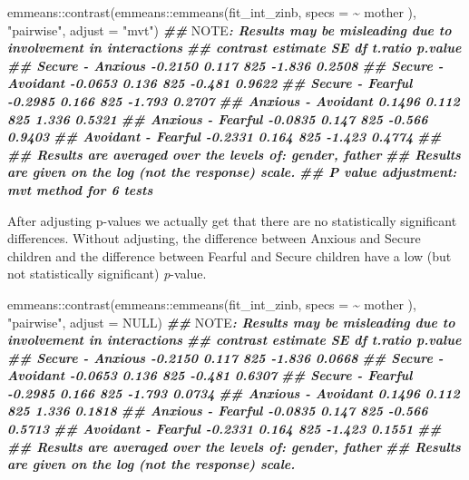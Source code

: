 \documentclass[
]{book}
\newenvironment{Shaded}{\begin{snugshade}}{\end{snugshade}}
\newcommand{\AlertTok}[1]{\textcolor[rgb]{0.94,0.16,0.16}{#1}}
\newcommand{\AttributeTok}[1]{\textcolor[rgb]{0.77,0.63,0.00}{#1}}
\newcommand{\ConstantTok}[1]{\textcolor[rgb]{0.00,0.00,0.00}{#1}}
\newcommand{\DocumentationTok}[1]{\textcolor[rgb]{0.56,0.35,0.01}{\textbf{\textit{#1}}}}
\newcommand{\FunctionTok}[1]{\textcolor[rgb]{0.00,0.00,0.00}{#1}}
\newcommand{\NormalTok}[1]{#1}
\newcommand{\SpecialCharTok}[1]{\textcolor[rgb]{0.00,0.00,0.00}{#1}}
\newcommand{\StringTok}[1]{\textcolor[rgb]{0.31,0.60,0.02}{#1}}
\begin{document}
\begin{Shaded}
\begin{Highlighting}[]
\NormalTok{emmeans}\SpecialCharTok{::}\FunctionTok{contrast}\NormalTok{(emmeans}\SpecialCharTok{::}\FunctionTok{emmeans}\NormalTok{(fit\_int\_zinb, }\AttributeTok{specs =} \SpecialCharTok{\textasciitilde{}}\NormalTok{ mother ),}
                  \StringTok{"pairwise"}\NormalTok{, }\AttributeTok{adjust =} \StringTok{"mvt"}\NormalTok{)}
\DocumentationTok{\#\# }\AlertTok{NOTE}\DocumentationTok{: Results may be misleading due to involvement in interactions}
\DocumentationTok{\#\#  contrast           estimate    SE  df t.ratio p.value}
\DocumentationTok{\#\#  Secure {-} Anxious    {-}0.2150 0.117 825  {-}1.836  0.2508}
\DocumentationTok{\#\#  Secure {-} Avoidant   {-}0.0653 0.136 825  {-}0.481  0.9622}
\DocumentationTok{\#\#  Secure {-} Fearful    {-}0.2985 0.166 825  {-}1.793  0.2707}
\DocumentationTok{\#\#  Anxious {-} Avoidant   0.1496 0.112 825   1.336  0.5321}
\DocumentationTok{\#\#  Anxious {-} Fearful   {-}0.0835 0.147 825  {-}0.566  0.9403}
\DocumentationTok{\#\#  Avoidant {-} Fearful  {-}0.2331 0.164 825  {-}1.423  0.4774}
\DocumentationTok{\#\# }
\DocumentationTok{\#\# Results are averaged over the levels of: gender, father }
\DocumentationTok{\#\# Results are given on the log (not the response) scale. }
\DocumentationTok{\#\# P value adjustment: mvt method for 6 tests}
\end{Highlighting}
\end{Shaded}

After adjusting p-values we actually get that there are no statistically significant differences. Without adjusting, the difference between Anxious and Secure children and the difference between Fearful and Secure children have a low (but not statistically significant) \emph{p}-value.

\begin{Shaded}
\begin{Highlighting}[]
\NormalTok{emmeans}\SpecialCharTok{::}\FunctionTok{contrast}\NormalTok{(emmeans}\SpecialCharTok{::}\FunctionTok{emmeans}\NormalTok{(fit\_int\_zinb, }\AttributeTok{specs =} \SpecialCharTok{\textasciitilde{}}\NormalTok{ mother ),}
                  \StringTok{"pairwise"}\NormalTok{, }\AttributeTok{adjust =} \ConstantTok{NULL}\NormalTok{)}
\DocumentationTok{\#\# }\AlertTok{NOTE}\DocumentationTok{: Results may be misleading due to involvement in interactions}
\DocumentationTok{\#\#  contrast           estimate    SE  df t.ratio p.value}
\DocumentationTok{\#\#  Secure {-} Anxious    {-}0.2150 0.117 825  {-}1.836  0.0668}
\DocumentationTok{\#\#  Secure {-} Avoidant   {-}0.0653 0.136 825  {-}0.481  0.6307}
\DocumentationTok{\#\#  Secure {-} Fearful    {-}0.2985 0.166 825  {-}1.793  0.0734}
\DocumentationTok{\#\#  Anxious {-} Avoidant   0.1496 0.112 825   1.336  0.1818}
\DocumentationTok{\#\#  Anxious {-} Fearful   {-}0.0835 0.147 825  {-}0.566  0.5713}
\DocumentationTok{\#\#  Avoidant {-} Fearful  {-}0.2331 0.164 825  {-}1.423  0.1551}
\DocumentationTok{\#\# }
\DocumentationTok{\#\# Results are averaged over the levels of: gender, father }
\DocumentationTok{\#\# Results are given on the log (not the response) scale.}
\end{Highlighting}
\end{Shaded}
\end{document}
